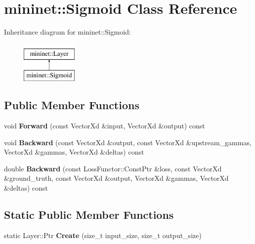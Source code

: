 \hypertarget{classmininet_1_1_sigmoid}{}\section{mininet\+:\+:Sigmoid Class Reference}
\label{classmininet_1_1_sigmoid}
Inheritance diagram for mininet\+:\+:Sigmoid\+:\begin{figure}[H]
\begin{center}
\leavevmode
\includegraphics[height=2.000000cm]{classmininet_1_1_sigmoid}
\end{center}
\end{figure}
\subsection*{Public Member Functions}
\begin{DoxyCompactItemize}
\item 
\hypertarget{classmininet_1_1_sigmoid_a06885fb79a725e2a23a7193260ba24fb}{}\label{classmininet_1_1_sigmoid_a06885fb79a725e2a23a7193260ba24fb} 
void {\bfseries Forward} (const Vector\+Xd \&input, Vector\+Xd \&output) const
\item 
\hypertarget{classmininet_1_1_sigmoid_a82cf517ea78cec757328dd72f63112e0}{}\label{classmininet_1_1_sigmoid_a82cf517ea78cec757328dd72f63112e0} 
void {\bfseries Backward} (const Vector\+Xd \&output, const Vector\+Xd \&upstream\+\_\+gammas, Vector\+Xd \&gammas, Vector\+Xd \&deltas) const
\item 
\hypertarget{classmininet_1_1_sigmoid_aeef523d0e4f19f486ef55e959e74ecbe}{}\label{classmininet_1_1_sigmoid_aeef523d0e4f19f486ef55e959e74ecbe} 
double {\bfseries Backward} (const Loss\+Functor\+::\+Const\+Ptr \&loss, const Vector\+Xd \&ground\+\_\+truth, const Vector\+Xd \&output, Vector\+Xd \&gammas, Vector\+Xd \&deltas) const
\end{DoxyCompactItemize}
\subsection*{Static Public Member Functions}
\begin{DoxyCompactItemize}
\item 
\hypertarget{classmininet_1_1_sigmoid_af3618be7c9f9f7cd223932f05c6a99ce}{}\label{classmininet_1_1_sigmoid_af3618be7c9f9f7cd223932f05c6a99ce} 
static Layer\+::\+Ptr {\bfseries Create} (size\+\_\+t input\+\_\+size, size\+\_\+t output\+\_\+size)
\end{DoxyCompactItemize}
